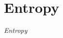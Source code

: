 \section{Entropy}\label{sec:Entropy}
\begin{definition}[Entropy]\label{def:Entropy}
  \emph{Entropy}
\end{definition}

